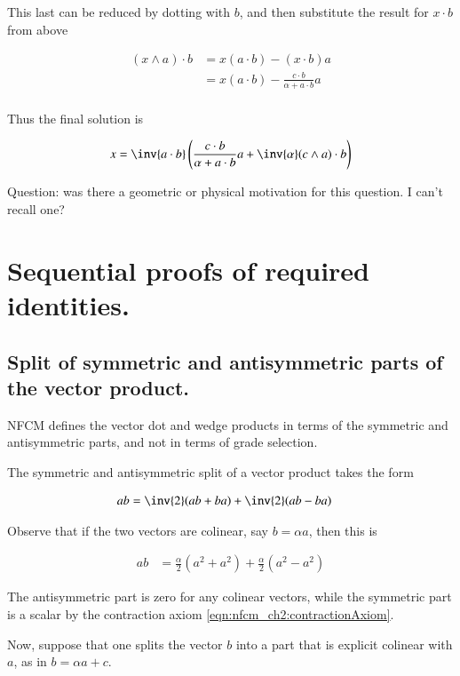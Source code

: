 This last can be reduced by dotting with $b$, and then substitute the 
result for $x \cdot b$ from above

\begin{align*}
(x \wedge a) \cdot b
&= x (a \cdot b) - (x \cdot b) a \\
&= x (a \cdot b) - \frac{c \cdot b}{\alpha + a \cdot b} a \\
\end{align*}

Thus the final solution is

\begin{align*}
x = \inv{a \cdot b}\left(
\frac{c \cdot b}{\alpha + a \cdot b} a 
+ \inv{\alpha} (c \wedge a) \cdot b
\right)
\end{align*}

Question: was there a geometric or physical motivation for this question.  I can't recall one?

\section{Sequential proofs of required identities. }

\subsection{Split of symmetric and antisymmetric parts of the vector product. }

NFCM defines the vector dot and wedge products in terms of the symmetric and antisymmetric parts, and not in terms of grade
selection.

The symmetric and antisymmetric split of a vector product takes the form

\begin{align*}
a b &= \inv{2}(a b + b a) + \inv{2}(a b - b a)
\end{align*}

Observe that if the two vectors are colinear, say $b = \alpha a$, then this is

\begin{align*}
a b &= \frac{\alpha}{2} (a^2 + a^2) + \frac{\alpha}{2}(a^2 - a^2 )
\end{align*}

The antisymmetric part is zero for any colinear vectors, while the symmetric part is a scalar by the contraction axiom \ref{eqn:nfcm_ch2:contractionAxiom}.

Now, suppose that one splits the vector $b$ into a part that is explicit
colinear with $a$, as in $b = \alpha a + c$.

